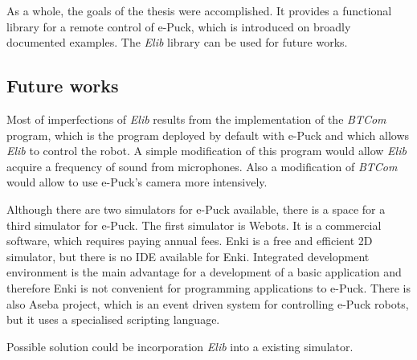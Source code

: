 	As a whole, the goals of the thesis were accomplished. It provides a functional library for
	a remote control of e-Puck, which is introduced on broadly documented examples.
	The {\it Elib} library can be used for future works.

\subsection*{Future works}
	Most of imperfections of {\it Elib} results from the implementation of the {\it BTCom} program,
	which is the program deployed by default with e-Puck and which allows {\it Elib} to control the robot.
	A simple modification of this program would allow {\it Elib} acquire a frequency of sound from microphones.
	Also a modification of {\it BTCom} would allow to use e-Puck's camera more intensively.

	Although there are two simulators for e-Puck available, there is a space for a third simulator for e-Puck.
	The first simulator is Webots. It is a commercial software, which requires paying annual fees.
	Enki is a free and efficient 2D simulator, but there is no IDE available for Enki. Integrated
	development environment is the main advantage for a development of a basic application and therefore Enki is not
	convenient for programming applications to e-Puck.
	There is also Aseba project, which is an event driven system for controlling e-Puck robots, 
	but it uses a specialised scripting language.

	Possible solution could be incorporation {\it Elib} into a existing simulator.
